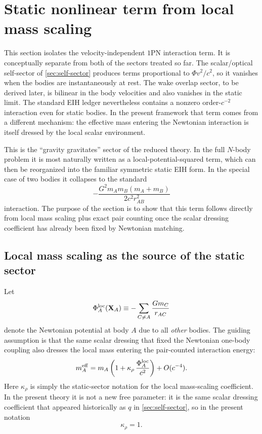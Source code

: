 \documentclass[11pt]{article}
\newcommand{\krho}{\kappa_{\rho}}
\newcommand{\PhiN}{\Phi}
\begin{document}
\section{Static nonlinear term from local mass scaling}
\label{sec:static-term}

This section isolates the velocity-independent \(1\)PN interaction term. It is
conceptually separate from both of the sectors treated so far. The scalar/optical
self-sector of \cref{sec:self-sector} produces terms proportional to
\(\PhiN v^2/c^2\), so it vanishes when the bodies are instantaneously at rest. The wake
overlap sector, to be derived later, is bilinear in the body velocities and also vanishes
in the static limit. The standard EIH ledger nevertheless contains a nonzero
order-\(c^{-2}\) interaction even for static bodies. In the present framework that term
comes from a different mechanism: the effective mass entering the Newtonian interaction is
itself dressed by the local scalar environment.

This is the ``gravity gravitates'' sector of the reduced theory. In the full \(N\)-body
problem it is most naturally written as a local-potential-squared term, which can then be
reorganized into the familiar symmetric static EIH form. In the special case of two
bodies it collapses to the standard
\[
-\frac{G^2 m_A m_B (m_A+m_B)}{2 c^2 r_{AB}^2}
\]
interaction. The purpose of the section is to show that this term follows directly from
local mass scaling plus exact pair counting once the scalar dressing coefficient has
already been fixed by Newtonian matching.

\subsection{Local mass scaling as the source of the static sector}
\label{sec:mass-scaling-ansatz}

Let
\begin{equation}
\Phi_A^{\rm loc}(\mathbf X_A)
\equiv
-\sum_{C\neq A}\frac{Gm_C}{r_{AC}}
\label{eq:phi-local-def}
\end{equation}
denote the Newtonian potential at body \(A\) due to all \emph{other} bodies. The guiding
assumption is that the same scalar dressing that fixed the Newtonian one-body coupling
also dresses the local mass entering the pair-counted interaction energy:
\begin{equation}
m_A^{\rm eff}
=
m_A\left(1+\krho\,\frac{\Phi_A^{\rm loc}}{c^2}\right)
+ O(c^{-4}).
\label{eq:local-mass-scaling}
\end{equation}
Here \(\krho\) is simply the static-sector notation for the local mass-scaling
coefficient. In the present theory it is not a new free parameter: it is the same scalar
dressing coefficient that appeared historically as \(q\) in \cref{sec:self-sector}, so in
the present notation
\begin{equation}
\krho=1.
\label{eq:kappa-rho-equals-one}
\end{equation}
\end{document}
